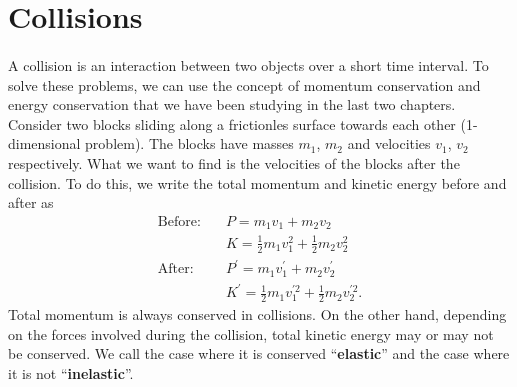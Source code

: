 \documentclass[../newtonian_mechanics.tex]{subfiles}
\begin{document}
    \section{Collisions}
        \paragraph{}
        A collision is an interaction between two objects over a short time interval.
        To solve these problems, we can use the concept of momentum conservation and energy conservation that we have been studying in the last two chapters.
        Consider two blocks sliding along a frictionles surface towards each other (1-dimensional problem).
        The blocks have masses $m_1$, $m_2$ and velocities $v_1$, $v_2$ respectively.
        What we want to find is the velocities of the blocks after the collision.
        To do this, we write the total momentum and kinetic energy before and after as
        \begin{align}
            \text{Before:}\quad& P=m_1v_1+m_2v_2\\
            & K=\frac{1}{2}m_1v_1^2+\frac{1}{2}m_2v_2^2\\
            \text{After:}\quad& P^\prime=m_1v_1^\prime+m_2v_2^\prime\\
            & K^\prime=\frac{1}{2}m_1v_1^{\prime 2}+\frac{1}{2}m_2v_2^{\prime 2}.
        \end{align}
        Total momentum is always conserved in collisions.
        On the other hand, depending on the forces involved during the collision, total kinetic energy may or may not be conserved.
        We call the case where it is conserved ``\textbf{elastic}'' and the case where it is not ``\textbf{inelastic}''. 
\end{document}
